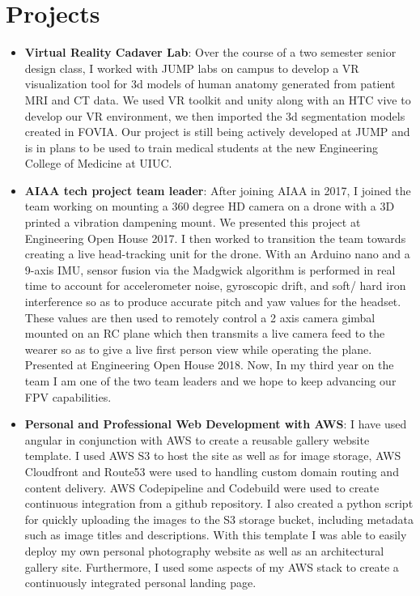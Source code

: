 \documentclass[letterpaper,10pt]{article}
\newcommand{\resumeItem}[2]{
  \item\small{
    \textbf{#1}{: #2 \vspace{-2pt}}
  }
}
\newcommand{\resumeSubItem}[2]{\resumeItem{#1}{#2}\vspace{-4pt}}
\newcommand{\resumeSubHeadingListStart}{\begin{itemize}[leftmargin=*]}
\newcommand{\resumeSubHeadingListEnd}{\end{itemize}}
\begin{document}
\section{Projects}
  \resumeSubHeadingListStart
   \resumeSubItem{Virtual Reality Cadaver Lab}
      {Over the course of a two semester senior design class, I worked with JUMP labs on campus to develop a VR visualization tool for 3d models of human anatomy generated from patient MRI and CT data. We used VR toolkit and unity along with an HTC vive to develop our VR environment, we then imported the 3d segmentation models created in FOVIA. Our project is still being actively developed at JUMP and is in plans to be used to train medical students at the new Engineering College of Medicine at UIUC. }
    \resumeSubItem{AIAA tech project team leader}
      {After joining AIAA in 2017, I joined the team working on mounting a 360 degree HD camera on a drone with a 3D printed a vibration dampening mount. We presented this project at Engineering Open House 2017. I then worked to transition the team towards creating a live head-tracking unit for the drone. With an Arduino nano and a 9-axis IMU, sensor fusion via the Madgwick algorithm is performed in real time to account for accelerometer noise, gyroscopic drift, and soft/ hard iron interference so as to produce accurate pitch and yaw values for the headset. These values are then used to remotely control a 2 axis camera gimbal mounted on an RC plane which then transmits a live camera feed to the wearer so as to give a live first person view while operating the plane. Presented at Engineering Open House 2018. Now, In my third year on the team I am one of the two team leaders and we hope to keep advancing our FPV capabilities.}
    \resumeSubItem{Personal and Professional Web Development with AWS}
      {I have used angular in conjunction with AWS to create a reusable gallery website template. I used AWS S3 to host the site as well as for image storage, AWS Cloudfront and Route53 were used to handling custom domain routing and content delivery. AWS Codepipeline and Codebuild were used to create continuous integration from a github repository. I also created a python script for quickly uploading the images to the S3 storage bucket, including metadata such as image titles and descriptions. With this template I was able to easily deploy my own personal photography website as well as an architectural gallery site. Furthermore, I used some aspects of my AWS stack to create a continuously integrated personal landing page. }
    \resumeSubHeadingListEnd
\end{document}
